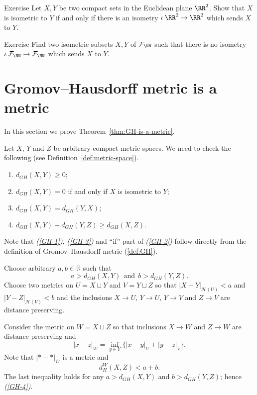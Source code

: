 \begin{thm}{Exercise}\label{ex:euclid-isom}
Let $X,Y$ be two compact sets in the Euclidean plane $\RR^2$.
Show that $X$ is isometric to $Y$ if and only if there is an isometry $\iota\:\RR^2\to \RR^2$
which sends $X$ to $Y$.
\end{thm}

\begin{thm}{Exercise}\label{ex:mink-isom}
Find two isometric subsets $X,Y$ of $\mathcal{F}_\NN$
such that there is no isometry $\iota\:\mathcal{F}_\NN\to \mathcal{F}_\NN$ 
which sends $X$ to $Y$.
\end{thm}














\section{Gromov--Hausdorff metric is a metric}

In this section we prove  Theorem~\ref{thm:GH-is-a-metric}.


Let $X$, $Y$ and $Z$ be arbitrary  compact metric spaces.
We need to check the following (see Definition~\ref{def:metric-space}).
\begin{enumerate}[{\it (i)}]
\item\label{GH-1} $d_{GH}(X,Y)\ge 0$;
\item\label{GH-2} $d_{GH}(X,Y)=0$ if and only if $X$ is isometric to $Y$;
\item\label{GH-3} $d_{GH}(X,Y)=d_{GH}(Y,X)$;
\item\label{GH-4} $d_{GH}(X,Y)+d_{GH}(Y,Z)\ge d_{GH}(X,Z)$.
\end{enumerate}


Note that {\it (\ref{GH-1})}, {\it(\ref{GH-3})} and ``if''-part of {\it(\ref{GH-2})} follow directly from the definition of Gromov--Hausdorff metric (\ref{def:GH}).

Choose arbitrary $a,b \in \mathbb{R}$ such that
$$a>d_{GH}(X,Y)\ \ \text{and}\ \  b>d_{GH}(Y,Z).$$
Choose two metrics on $U=X\sqcup Y$ and $V=Y\sqcup Z$ so that
$|X-Y|_{\mathcal{H}(U)}<a$ and $|Y-Z|_{\mathcal{H}(V)}<b$ 
and the inclusions $X\to U$, $Y\to U$, $Y\to V$ and $Z\to V$ are distance preserving.

Consider the metric on $W=X\sqcup Z$ 
so that inclusions $X\to W$ and $Z\to W$ are distance preserving
and 
$$|x-z|_W=\inf_{y\in Y}\{|x-y|_U+|y-z|_V\}.$$
Note that $|{*}-{*}|_W$ is a metric and 
$$d^W_H(X,Z)<a+b.$$
The last inequality holds for any $a>d_{GH}(X,Y)$ and $b>d_{GH}(Y,Z)$;
hence {\it (\ref{GH-4})}.
\qeds

